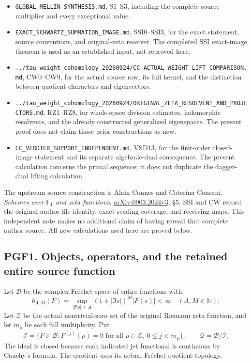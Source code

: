 \begin{itemize}
\tightlist
\item
  \texttt{GLOBAL\_MELLIN\_SYNTHESIS.md}, S1--S3, including the complete
  source multiplier and every exceptional value.
\item
  \nolinkurl{EXACT_SCHWARTZ_SUMMATION_IMAGE.md}, SSI0--SSI3, for the
  exact statement, source conventions, and original-zeta receiver. The
  completed SSI exact-image theorem is used as an established input, not
  reproved here.
\item
  \nolinkurl{../tau_weight_cohomology_20260924/CC_ACTUAL_WEIGHT_LIFT_COMPARISON.md},
  CW0--CW9, for the actual source row, its full kernel, and the
  distinction between quotient characters and eigenvectors.
\item
  \nolinkurl{../tau_weight_cohomology_20260924/ORIGINAL_ZETA_RESOLVENT_AND_PROJECTORS.md},
  RZ1--RZ8, for whole-space division estimates, holomorphic resolvents,
  and the already constructed generalized eigenspaces. The present proof
  does not claim those prior constructions as new.
\item
  \nolinkurl{CC_VERDIER_SUPPORT_INDEPENDENT.md}, VSD13, for the
  first-order closed-image statement and its separate algebraic-dual
  consequence. The present calculation concerns the primal sequence; it
  does not duplicate the dagger-dual lifting calculation.
\end{itemize}

The upstream source construction is Alain Connes and Caterina Consani,
\emph{Schemes over \(\mathbb F_1\) and zeta functions},
\href{https://arxiv.org/abs/0903.2024v3}{arXiv:0903.2024v3}, §5. SSI and
CW record the original author-file identity, exact reading coverage, and
receiving maps. This independent note makes no additional claim of
having reread that complete author source. All new calculations used
here are proved below.

\subsection{PGF1. Objects, operators, and the retained entire source
function}\label{pgf1.-objects-operators-and-the-retained-entire-source-function}

Let \(\mathcal B\) be the complex Fréchet space of entire functions with
\[
b_{A,M}(F)=\sup_{|\Re s|\le A}(1+|\Im s|)^M|F(s)|<\infty
\quad(A,M\in\mathbb N).
\tag{PGF1.1}
\] Let \(\mathscr Z\) be the actual nontrivial-zero set of the original
Riemann zeta function, and let \(m_\rho\) be each full multiplicity. Put
\[
\mathcal I=\{F\in\mathcal B:F^{(j)}(\rho)=0
\text{ for all }\rho\in\mathscr Z,\ 0\le j<m_\rho\},
\qquad \mathcal Q=\mathcal B/\mathcal I.
\tag{PGF1.2}
\] The ideal is closed because each indicated jet functional is
continuous by Cauchy's formula. The quotient uses its actual Fréchet
quotient topology.

